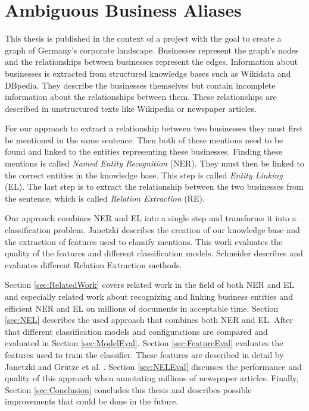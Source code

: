 \section{Ambiguous Business Aliases}
\label{sec:Introduction2}
This thesis is published in the context of a project with the goal to create a graph of Germany's corporate landscape. Businesses represent the graph's nodes and the relationships between businesses represent the edges. Information about businesses is extracted from structured knowledge bases such as Wikidata and DBpedia. They describe the businesses themselves but contain incomplete information about the relationships between them. These relationships are described in unstructured texts like Wikipedia or newspaper articles.\par
For our approach to extract a relationship between two businesses they must first be mentioned in the same sentence. Then both of these mentions need to be found and linked to the entities representing these businesses. Finding these mentions is called \textit{Named Entity Recognition} (NER). They must then be linked to the correct entities in the knowledge base. This step is called \textit{Entity Linking} (EL). The last step is to extract the relationship between the two businesses from the sentence, which is called \textit{Relation Extraction} (RE).\par
Our approach combines NER and EL into a single step and transforms it into a classification problem. Janetzki \cite{janetzki} describes the creation of our knowledge base and the extraction of features used to classify mentions. This work evaluates the quality of the features and different classification models. Schneider \cite{schneider} describes and evaluates different Relation Extraction methods.\par
Section \ref{sec:RelatedWork} covers related work in the field of both NER and EL and especially related work about recognizing and linking business entities and efficient NER and EL on millions of documents in acceptable time. Section \ref{sec:NEL} describes the used approach that combines both NER and EL. After that different classification models and configurations are compared and evaluated in Section \ref{sec:ModelEval}. Section \ref{sec:FeatureEval} evaluates the features used to train the classifier. These features are described in detail by Janetzki \cite{janetzki} and Grütze et al. \cite{coheel}. Section \ref{sec:NELEval} discusses the performance and quality of this approach when annotating millions of newspaper articles. Finally, Section \ref{sec:Conclusion} concludes this thesis and describes possible improvements that could be done in the future.

